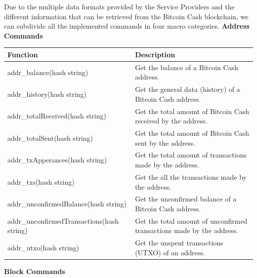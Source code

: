 Due to the multiple data formats provided by the Service Providers and the 
different information that can be retrieved from the Bitcoin Cash blockchain, 
we can subdivide all the implemented commands in four macro categories.\medskip
\textbf{Address Commands}
\begin{table}[!ht]
    \centering
    \begin{tabular}{||l|p{6cm}||}
    \hline
    \textbf{Function}                          & \textbf{Description}                                                  \\ \hline
    addr\_balance(hash string)                 & Get the balance of a Bitcoin Cash address.                            \\ \hline
    addr\_history(hash string)                 & Get the general data (history) of a Bitcoin Cash address.             \\ \hline
    addr\_totalReceived(hash string)           & Get the total amount of Bitcoin Cash received by the address.         \\ \hline
    addr\_totalSent(hash string)               & Get the total amount of Bitcoin Cash sent by the address.             \\ \hline
    addr\_txApperances(hash string)            & Get the total amount of transactions made by the address.             \\ \hline
    addr\_txs(hash string)                     & Get the all the transactions made by the address.                     \\ \hline
    addr\_unconfirmedBalance(hash string)      & Get the unconfirmed balance of a Bitcoin Cash address.                \\ \hline
    addr\_unconfirmedTransactions(hash string) & Get the total amount of unconfirmed transactions made by the address. \\ \hline
    addr\_utxo(hash string)                    & Get the unspent transactions (UTXO) of an address.                    \\ \hline
    \end{tabular}
    \end{table}
\medskip 
\textbf{Block Commands}
